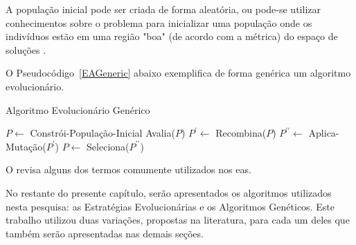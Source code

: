 A população inicial pode ser criada de forma aleatória, ou pode-se utilizar 
conhecimentos sobre o problema para inicializar uma população onde os indivíduos 
estão em uma região "boa" (de acordo com a métrica) do espaço de soluções 
\citep{Luke2013Metaheuristics}.

O Pseudocódigo~\ref{EAGeneric} abaixo exemplifica de forma genérica um algoritmo 
evolucionário.

\begin{algorithm}                      %
	\caption{Algoritmo Evolucionário Genérico}          %
	\label{EAGeneric}                           %
	\begin{algorithmic}                    %
		\State $P \gets $ Constrói-População-Inicial
		\Repeat
			\State Avalia($P$)
			\State $P^{\prime} \gets $ Recombina($P$)
			\State $P^{\prime \prime} \gets $ Aplica-Mutação($P^{\prime}$)
			\State $P \gets $ Seleciona($P^{\prime \prime}$)
		\EndProcedure
	\end{algorithmic}
\end{algorithm}

O  revisa alguns dos termos comumente utilizados nos 
\acp{ea}.

No restante do presente capítulo, serão apresentados os algoritmos utilizados 
nesta pesquisa: as Estratégias Evolucionárias e os Algoritmos Genéticos. Este 
trabalho utilizou duas variações, propostas na literatura, para cada um deles 
que também serão apresentadas nas demais seções.

